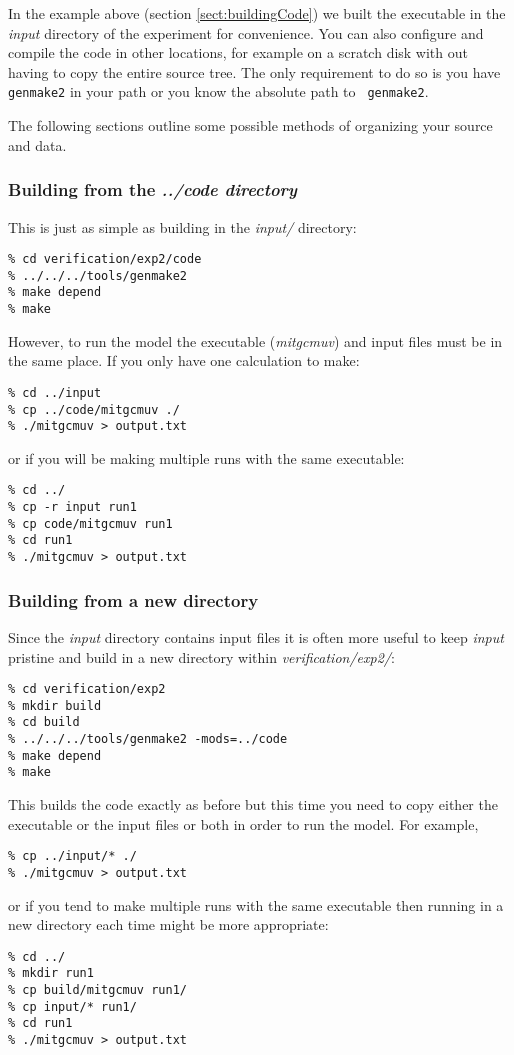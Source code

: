 In the example above (section \ref{sect:buildingCode}) we built the
executable in the {\em input} directory of the experiment for
convenience. You can also configure and compile the code in other
locations, for example on a scratch disk with out having to copy the
entire source tree. The only requirement to do so is you have {\tt
  genmake2} in your path or you know the absolute path to {\tt
  genmake2}.

The following sections outline some possible methods of organizing
your source and data.

\subsubsection{Building from the {\em ../code directory}}

This is just as simple as building in the {\em input/} directory:
\begin{verbatim}
% cd verification/exp2/code
% ../../../tools/genmake2
% make depend
% make
\end{verbatim}
However, to run the model the executable ({\em mitgcmuv}) and input
files must be in the same place. If you only have one calculation to make:
\begin{verbatim}
% cd ../input
% cp ../code/mitgcmuv ./
% ./mitgcmuv > output.txt
\end{verbatim}
or if you will be making multiple runs with the same executable:
\begin{verbatim}
% cd ../
% cp -r input run1
% cp code/mitgcmuv run1
% cd run1
% ./mitgcmuv > output.txt
\end{verbatim}

\subsubsection{Building from a new directory}

Since the {\em input} directory contains input files it is often more
useful to keep {\em input} pristine and build in a new directory
within {\em verification/exp2/}:
\begin{verbatim}
% cd verification/exp2
% mkdir build
% cd build
% ../../../tools/genmake2 -mods=../code
% make depend
% make
\end{verbatim}
This builds the code exactly as before but this time you need to copy
either the executable or the input files or both in order to run the
model. For example,
\begin{verbatim}
% cp ../input/* ./
% ./mitgcmuv > output.txt
\end{verbatim}
or if you tend to make multiple runs with the same executable then
running in a new directory each time might be more appropriate:
\begin{verbatim}
% cd ../
% mkdir run1
% cp build/mitgcmuv run1/
% cp input/* run1/
% cd run1
% ./mitgcmuv > output.txt
\end{verbatim}

